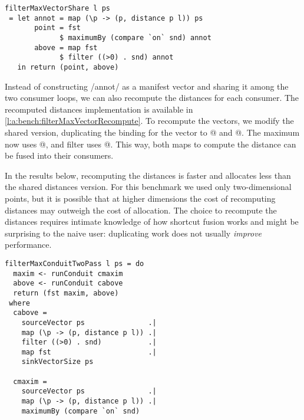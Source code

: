 
\begin{lstlisting}[float,label=l:bench:filterMaxVectorShare,caption=Vector / share implementation of filterMax]
filterMaxVectorShare l ps
 = let annot = map (\p -> (p, distance p l)) ps
       point = fst
             $ maximumBy (compare `on` snd) annot
       above = map fst
             $ filter ((>0) . snd) annot
   in return (point, above)
\end{lstlisting}


Instead of constructing \Hs/annot/ as a manifest vector and sharing it among the two consumer loops, we can also recompute the distances for each consumer.
The recomputed distances implementation is available in \cref{l:a:bench:filterMaxVectorRecompute}.
To recompute the vectors, we modify the shared version, duplicating the binding for the \Hs@annot@ vector to @ and @. The maximum now uses @, and filter uses @.
This way, both maps to compute the distance can be fused into their consumers.

In the results below, recomputing the distances is faster and allocates less than the shared distances version.
For this benchmark we used only two-dimensional points, but it is possible that at higher dimensions the cost of recomputing distances may outweigh the cost of allocation.
The choice to recompute the distances requires intimate knowledge of how shortcut fusion works and might be surprising to the naive user: duplicating work does not usually \emph{improve} performance.

\begin{lstlisting}[float,label=l:a:bench:filterMaxConduitTwoPass,caption=Conduit two-pass implementation of \Hs/filterMax/]
filterMaxConduitTwoPass l ps = do
  maxim <- runConduit cmaxim
  above <- runConduit cabove
  return (fst maxim, above)
 where
  cabove =
    sourceVector ps               .|
    map (\p -> (p, distance p l)) .|
    filter ((>0) . snd)           .|
    map fst                       .|
    sinkVectorSize ps

  cmaxim =
    sourceVector ps               .|
    map (\p -> (p, distance p l)) .|
    maximumBy (compare `on` snd)
\end{lstlisting}

